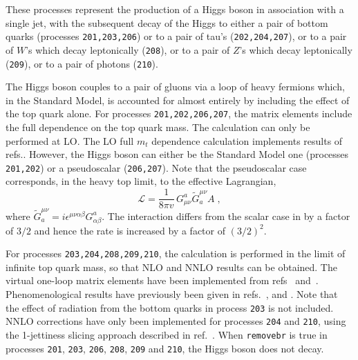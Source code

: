 \label{subsec:hjet}

These processes represent the production of a Higgs boson in association
with a single jet, with the subsequent decay of the Higgs to either
a pair of bottom quarks (processes {\tt 201,203,206})
or to a pair of tau's ({\tt 202,204,207}),
or to a pair of $W$'s which decay leptonically ({\tt 208}),
or to a pair of $Z$'s which decay leptonically ({\tt 209}),
or to a pair of photons ({\tt 210}).

The Higgs boson couples to a pair of gluons via a loop of heavy fermions
which, in the Standard Model, is accounted for almost entirely by including
the effect of the top quark alone. For processes {\tt 201,202,206,207}, the
matrix elements include the full dependence on the top quark mass.
The calculation can only be performed at LO.
The LO full $m_t$ dependence calculation implements results of refs.\cite{Ellis:1987xu,Baur:1989cm}.
However, the Higgs boson can either be the Standard Model one
(processes {\tt 201,202}) or a pseudoscalar ({\tt 206,207}).
Note that the pseudoscalar case corresponds, in the heavy top limit, to the effective Lagrangian,
\begin{equation}
\mathcal{L} = \frac{1}{8\pi v} \, G^a_{\mu\nu} \widetilde G^{\mu\nu}_a A \;,
\end{equation}
where $\widetilde G^{\mu\nu}_a = i\epsilon^{\mu\nu\alpha\beta}
 G_{\alpha\beta}^a$.
The interaction differs from the scalar case in by a factor of $3/2$
and hence the rate is increased by a factor of $(3/2)^2$.


For processes {\tt 203,204,208,209,210}, the calculation is performed in the
limit of infinite top quark mass, so that NLO and NNLO results can be obtained.
The virtual one-loop matrix elements have been implemented from
refs~\cite{Ravindran:2002dc} and~\cite{Schmidt:1997wr}.
Phenomenological results have previously been
given in refs.~\cite{deFlorian:1999zd},\cite{Ravindran:2002dc}
and \cite{Glosser:2002gm}.
Note that the effect of radiation from the bottom quarks in process {\tt 203}
is not included.
NNLO corrections have only been implemented for processes {\tt 204} and {\tt 210},
using the 1-jettiness slicing approach described in  ref.~\cite{Campbell:2019gmd}.
When {\tt removebr} is true in processes {\tt 201}, {\tt 203}, {\tt 206}, {\tt 208}, {\tt 209}
and {\tt 210}, the Higgs boson does not decay.

